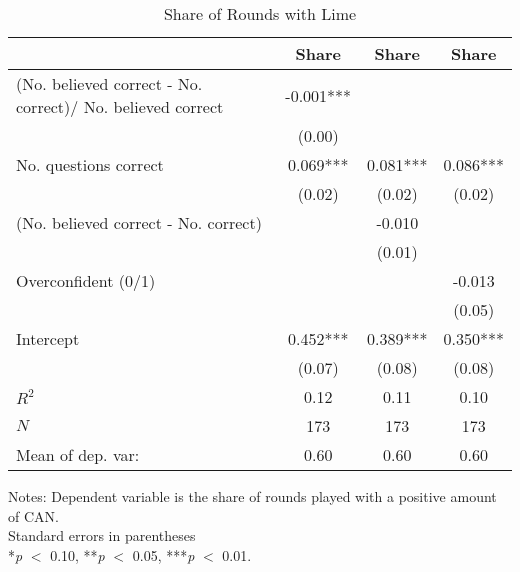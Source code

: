 \begin{table}[htbp]
\centering
\hspace*{-1.2cm}
\begin{threeparttable}
\caption{Share of Rounds with Lime}
\label{tab:D1lime}
\begin{tabular}{l ccc}
\hline
\hline
                    &       Share   &       Share   &       Share   \\
\hline
(No. believed correct - No. correct)/ No. believed correct&      -0.001***&               &               \\
                    &      (0.00)   &               &               \\
No. questions correct&       0.069***&       0.081***&       0.086***\\
                    &      (0.02)   &      (0.02)   &      (0.02)   \\
(No. believed correct - No. correct)&               &      -0.010   &               \\
                    &               &      (0.01)   &               \\
Overconfident (0/1) &               &               &      -0.013   \\
                    &               &               &      (0.05)   \\
Intercept           &       0.452***&       0.389***&       0.350***\\
                    &      (0.07)   &      (0.08)   &      (0.08)   \\
\hline
$R^2$               &        0.12   &        0.11   &        0.10   \\
$N$                 &         173   &         173   &         173   \\
Mean of dep. var:   &        0.60   &        0.60   &        0.60   \\
\hline
\hline
\end{tabular}
\begin{tablenotes}
\footnotesize
\item{Notes: Dependent variable is the share of rounds played with a positive amount of CAN. \\ Standard errors in parentheses \\ *\textit{p} $<$ 0.10, **\textit{p} $<$ 0.05, ***\textit{p} $<$ 0.01.}
\end{tablenotes}
\end{threeparttable}
\end{table}
